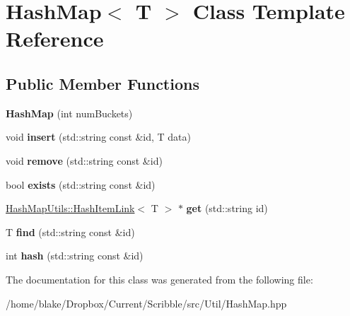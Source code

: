 \hypertarget{class_hash_map}{\section{Hash\-Map$<$ T $>$ Class Template Reference}
\label{class_hash_map}
}
\subsection*{Public Member Functions}
\begin{DoxyCompactItemize}
\item 
\hypertarget{class_hash_map_a1c094bc1e51d732ac542ecd1502942b7}{{\bfseries Hash\-Map} (int num\-Buckets)}\label{class_hash_map_a1c094bc1e51d732ac542ecd1502942b7}

\item 
\hypertarget{class_hash_map_a07cdeb5f7a6d9bf53fcfe7ef52ed6e8d}{void {\bfseries insert} (std\-::string const \&id, T data)}\label{class_hash_map_a07cdeb5f7a6d9bf53fcfe7ef52ed6e8d}

\item 
\hypertarget{class_hash_map_a7ab3442f1c4926e12bbabfaf81d058d8}{void {\bfseries remove} (std\-::string const \&id)}\label{class_hash_map_a7ab3442f1c4926e12bbabfaf81d058d8}

\item 
\hypertarget{class_hash_map_acff0cebde7c1336375288c1f5e385a0f}{bool {\bfseries exists} (std\-::string const \&id)}\label{class_hash_map_acff0cebde7c1336375288c1f5e385a0f}

\item 
\hypertarget{class_hash_map_a46d88f4743bc0b902b9445ffe5ea7b28}{\hyperlink{class_hash_map_utils_1_1_hash_item_link}{Hash\-Map\-Utils\-::\-Hash\-Item\-Link}$<$ T $>$ $\ast$ {\bfseries get} (std\-::string id)}\label{class_hash_map_a46d88f4743bc0b902b9445ffe5ea7b28}

\item 
\hypertarget{class_hash_map_a2b444615edc86733e39fcfc239cba3eb}{T {\bfseries find} (std\-::string const \&id)}\label{class_hash_map_a2b444615edc86733e39fcfc239cba3eb}

\item 
\hypertarget{class_hash_map_a8c7dc4e82eef162d05ef816f7e7dacb2}{int {\bfseries hash} (std\-::string const \&id)}\label{class_hash_map_a8c7dc4e82eef162d05ef816f7e7dacb2}

\end{DoxyCompactItemize}


The documentation for this class was generated from the following file\-:\begin{DoxyCompactItemize}
\item 
/home/blake/\-Dropbox/\-Current/\-Scribble/src/\-Util/Hash\-Map.\-hpp\end{DoxyCompactItemize}

